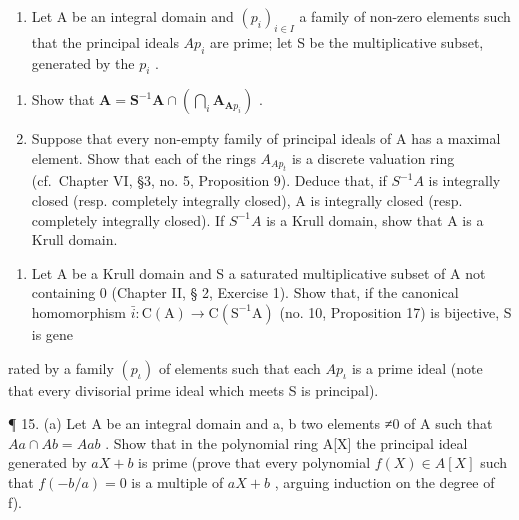 \begin{enumerate}
\def\labelenumi{\arabic{enumi}.}
\setcounter{enumi}{12}
\tightlist
\item
  Let A be an integral domain and \((p_{i})_{i\in I}\) a family of non-zero elements such that the principal ideals \(Ap_{i}\) are prime; let S be the multiplicative subset, generated by the \(p_{i}\) .
\end{enumerate}

\begin{enumerate}
\def\labelenumi{(\alph{enumi})}
\item
  Show that \(\mathbf{A} = \mathbf{S}^{-1}\mathbf{A}\cap \left(\bigcap_{i}\mathbf{A}_{\mathbf{A}p_i}\right)\) .
\item
  Suppose that every non-empty family of principal ideals of A has a maximal element. Show that each of the rings \(A_{Ap_{t}}\) is a discrete valuation ring (cf.~Chapter VI, §3, no. 5, Proposition 9). Deduce that, if \(S^{-1}A\) is integrally closed (resp. completely integrally closed), A is integrally closed (resp. completely integrally closed). If \(S^{-1}A\) is a Krull domain, show that A is a Krull domain.
\end{enumerate}

\begin{enumerate}
\def\labelenumi{\arabic{enumi}.}
\setcounter{enumi}{13}
\tightlist
\item
  Let A be a Krull domain and S a saturated multiplicative subset of A not containing 0 (Chapter II, § 2, Exercise 1). Show that, if the canonical homomorphism \(\bar{i}\colon\mathrm{C}(\mathrm{A})\to\mathrm{C}(\mathrm{S}^{-1}\mathrm{A})\) (no. 10, Proposition 17) is bijective, S is gene
\end{enumerate}
\relax{}

rated by a family \((p_{\iota})\) of elements such that each \(A p_{\iota}\) is a prime ideal (note that every divisorial prime ideal which meets S is principal).

¶ 15. (a) Let A be an integral domain and a, b two elements ≠0 of A such that \(Aa \cap Ab = Aab\) . Show that in the polynomial ring A{[}X{]} the principal ideal generated by \(aX + b\) is prime (prove that every polynomial \(f(X) \in A[X]\) such that \(f(-b/a) = 0\) is a multiple of \(aX + b\) , arguing induction on the degree of f).

